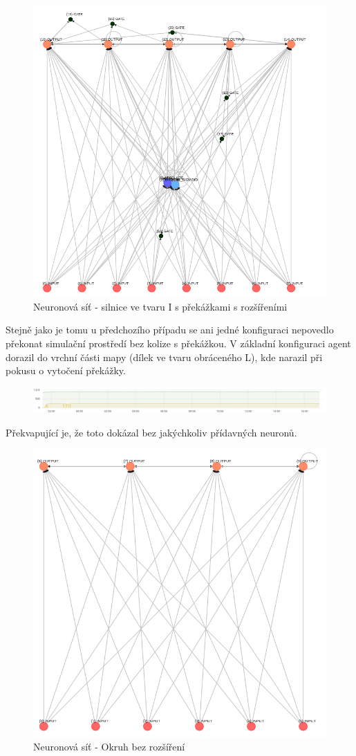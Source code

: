 \begin{figure}[H]
	\centering
	\includegraphics[width=0.7\linewidth]{solutions/IWithObstructions/advanced}
	\caption{Neuronová síť - silnice ve tvaru I s překážkami s rozšířeními}
	\label{fig:advanced}
\end{figure}

Stejně jako je tomu u předchozího případu se ani jedné konfiguraci nepovedlo překonat simulační prostředí bez kolize s překážkou.
V základní konfiguraci agent dorazil do vrchní části mapy (dílek ve tvaru obráceného L), kde narazil při pokusu o vytočení překážky.
\begin{figure}[H]
	\centering
	\includegraphics[width=0.5\linewidth]{solutions/Iadvanced/basicGraph}
	\caption{}
	\label{fig:basicgraph}
\end{figure}
Překvapující je, že toto dokázal bez jakýchkoliv přídavných neuronů.

\begin{figure}
	\centering
	\includegraphics[width=0.5\linewidth]{solutions/Iadvanced/basic}
	\caption{Neuronová síť - Okruh bez rozšíření}
	\label{fig:basic}
\end{figure}

